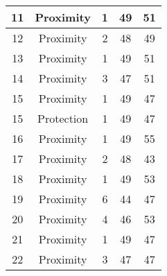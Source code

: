 \documentclass[results.tex]{subfiles}
\begin{document}
\begin{center}
\begin{tabular}{| c || c | c | c | c |}
            \hline
            11                      & Proximity                    & 1                      & 49                      & 51                   \\
            \hline
            12                      & Proximity                    & 2                      & 48                      & 49                   \\
            \hline
            13                      & Proximity                    & 1                      & 49                      & 51                   \\
            \hline
            14                      & Proximity                    & 3                      & 47                      & 51                   \\
            \hline
            15                      & Proximity                    & 1                      & 49                      & 47                   \\
            \hline
            15                      & Protection                   & 1                      & 49                      & 47                   \\
            \hline
            16                      & Proximity                    & 1                      & 49                      & 55                   \\
            \hline
            17                      & Proximity                    & 2                      & 48                      & 43                   \\
            \hline
            18                      & Proximity                    & 1                      & 49                      & 53                   \\
            \hline
            19                      & Proximity                    & 6                      & 44                      & 47                   \\
            \hline
            20                      & Proximity                    & 4                      & 46                      & 53                   \\
            \hline
            21                      & Proximity                    & 1                      & 49                      & 47                   \\
            \hline
            22                      & Proximity                    & 3                      & 47                      & 47                   \\

\end{tabular}
\end{center}
\end{document}

